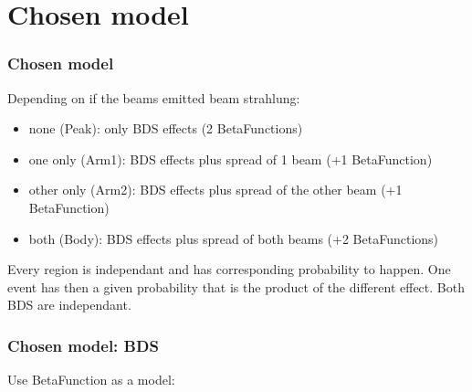\documentclass[handout]{beamer}
\begin{document}
\section{Chosen model}
\begin{frame}
\frametitle{Chosen model}
Depending on if the beams emitted beam strahlung: 
\begin{itemize}
  \item none (Peak): only BDS effects (2 BetaFunctions)
  \item one only (Arm1): BDS effects plus spread of 1 beam (+1 BetaFunction)
  \item other only (Arm2): BDS effects plus spread of the other beam (+1
  BetaFunction)
  \item both (Body): BDS effects plus spread of both beams (+2 BetaFunctions)
\end{itemize}
Every region is independant and has corresponding probability to happen. One
event has then a given probability that is the product of the different effect.
Both BDS are independant.
\end{frame}

\begin{frame}
\frametitle{Chosen model: BDS}
Use BetaFunction as a model:\\
\end{frame}
\end{document}
